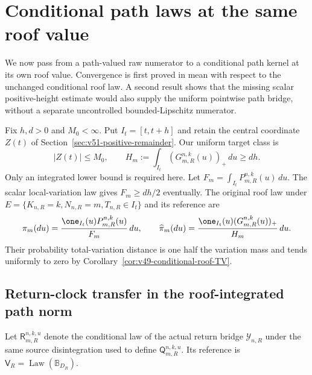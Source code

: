 \section{Conditional path laws at the same roof value}
\label{sec:v52-same-roof}
We now pass from a path-valued raw numerator to a conditional path
kernel at its own roof value. Convergence is first proved in mean
with respect to the unchanged conditional roof law. A second result
shows that the missing scalar positive-height estimate would also
supply the uniform pointwise path bridge, without a separate
uncontrolled bounded-Lipschitz numerator.

Fix $h,d>0$ and $M_0<\infty$. Put $I_t=[t,t+h]$ and retain the
central coordinate $Z(t)$ of Section~\ref{sec:v51-positive-remainder}.
Our uniform target class is
\begin{equation}\label{eq:v52-target-class}
 |Z(t)|\le M_0,\qquad
 H_m:=\int_{I_t}(G_{m,R}^{n,k}(u))_+\,du\ge dh.
\end{equation}
Only an integrated lower bound is required here. Let
$F_m=\int_{I_t}P_{m,R}^{n,k}(u)\,du$. The scalar local-variation
law gives $F_m\ge dh/2$ eventually. The original roof law under
$E=\{K_{n,R}=k,N_{n,R}=m,T_{n,R}\in I_t\}$ and its reference are
\[
 \pi_m(du)=\frac{\one_{I_t}(u)P_{m,R}^{n,k}(u)}{F_m}\,du,
 \qquad
 \widehat\pi_m(du)=\frac{\one_{I_t}(u)(G_{m,R}^{n,k}(u))_+}{H_m}\,du.
\]
Their probability total-variation distance is one half the variation
mass and tends uniformly to zero by
Corollary~\ref{cor:v49-conditional-roof-TV}.

\subsection{Return-clock transfer in the roof-integrated path norm}
Let $\mathsf R_{m,R}^{n,k,u}$ denote the conditional law of the actual
return bridge $\mathcal Y_{n,R}$ under the same source disintegration
used to define $\mathsf Q_{m,R}^{n,k,u}$. Its reference is
$\mathsf V_R=\operatorname{Law}(\mathbb B_{D_R})$.

